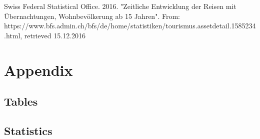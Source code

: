 \documentclass[12pt,a4paper,bibliography=totocnumbered,listof=totocnumbered]{scrartcl}
\begin{document}
%





Swiss Federal Statistical Office. 2016. "Zeitliche Entwicklung der Reisen mit Übernachtungen, Wohnbevölkerung ab 15 Jahren". From: https://www.bfs.admin.ch/bfs/de/home/statistiken/tourismus.assetdetail.1585234.html, retrieved 15.12.2016

%


%




\section{Appendix}



\subsection{Tables}

\subsection{Statistics}
\end{document}
